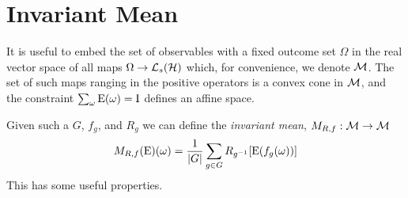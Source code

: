 \section{Invariant Mean}
\label{sec:invariant-mean}

It is useful to embed the set of observables with a fixed outcome set $\Omega$ in the real vector space of all maps $\Omega\to \saops[\hcal]$ which, for convenience, we denote $\mathcal{M}$. The set of such maps ranging in the positive operators is a convex cone in $\mathcal{M}$, and the constraint $\sum_\omega\operatorname{E}(\omega) = \operatorname{I}$ defines an affine space.

Given such a $G$, $f_g$, and $R_g$ we can define the \emph{invariant mean}, $M_{R,f}:\mathcal{M}\to\mathcal{M}$
\begin{equation}\label{eqn:inv-mean-defn}
  M_{R,f}(\operatorname{E})(\omega) = \frac{1}{{\left\lvert{G}\right\rvert}}\sum_{g\in G} R_{g^{-1}}\! \left[\operatorname{E}(f_g(\omega))\right]
\end{equation}
This has some useful properties. 

